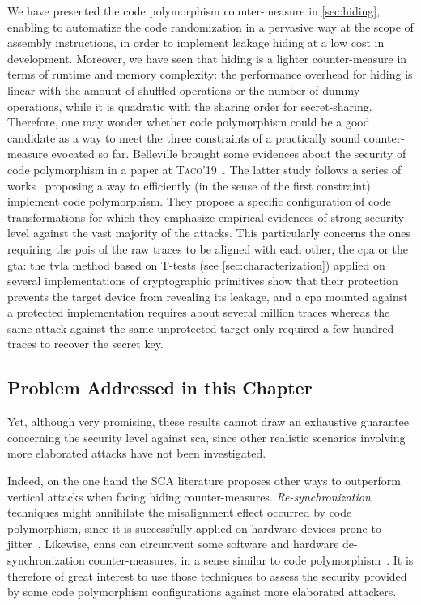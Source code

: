 We have presented the code polymorphism counter-measure in \autoref{sec:hiding}, enabling to automatize the code randomization in a pervasive way at the scope of assembly instructions, in order to implement leakage hiding at a low cost in development.
Moreover, we have seen that hiding is a lighter counter-measure in terms of runtime and memory complexity: the performance overhead for hiding is linear with the amount of shuffled operations or the number of dummy operations, while it is quadratic with the sharing order for secret-sharing.
Therefore, one may wonder whether code polymorphism could be a good candidate as a way to meet the three constraints of a practically sound counter-measure evocated so far.
Belleville \etal{} brought some evidences about the security of code polymorphism in a paper at \textsc{Taco}'19~\cite{belleville_automated_2019}.
The latter study follows a series of works~\cite{agosta_code_2012,agosta_meet_2015,courousse_runtime_2016} proposing a way to efficiently (in the sense of the first constraint) implement code polymorphism.
They propose a specific configuration of code transformations for which they emphasize empirical evidences of strong security level against the vast majority of the attacks.
This particularly concerns the ones requiring the \glspl{poi} of the raw traces to be aligned with each other, \eg{} the \gls{cpa} or the \gls{gta}: the \gls{tvla} method based on T-tests (see \autoref{sec:characterization}) applied on several implementations of cryptographic primitives show that their protection prevents the target device from revealing its leakage, and a \gls{cpa} mounted against a protected implementation requires about several million traces whereas the same attack against the same unprotected target only required a few hundred traces to recover the secret key.

\subsection{Problem Addressed in this Chapter}
\label{sec:problem}

Yet, although very promising, these results cannot draw an exhaustive guarantee concerning the security level against \gls{sca}, since other realistic scenarios involving more elaborated attacks have not been investigated.

Indeed, on the one hand the SCA literature proposes other ways to outperform vertical attacks when facing hiding counter-measures.
\emph{Re-synchronization} techniques might annihilate the misalignment effect occurred by code polymorphism, since it is successfully applied on hardware devices prone to jitter~\cite{nagashima_dpa_2007,van_woudenberg_improving_2011,durvaux_efficient_2012}.
Likewise, \glspl{cnn} can circumvent some software and hardware de-synchronization counter-measures, in a sense similar to code polymorphism~\cite{cagli_convolutional_2017,kim_make_2019}.
It is therefore of great interest to use those techniques to assess the security provided by some code polymorphism configurations against more elaborated attackers.

